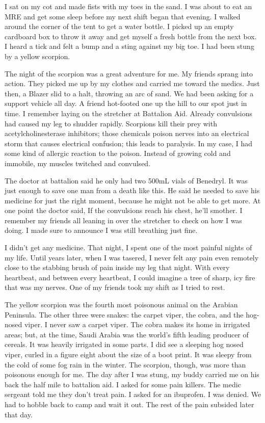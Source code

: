 I sat on my cot and made fists with my toes in the sand.  I was about to eat an MRE and get some sleep before my next shift began that evening.  I walked around the corner of the tent to get a water bottle.  I picked up an empty cardboard box to throw it away and get myself a fresh bottle from the next box.  I heard a tick and felt a bump and a sting against my big toe.  I had been stung by a yellow scorpion.

The night of the scorpion was a great adventure for me.  My friends sprang into action.  They picked me up by my clothes and carried me toward the medics.  Just then, a Blazer slid to a halt, throwing an arc of sand.  We had been asking for a support vehicle all day.  A friend hot-footed one up the hill to our spot just in time.  I remember laying on the stretcher at Battalion Aid.  Already convulsions had caused my leg to shudder rapidly.  Scorpions kill their prey with acetylcholinesterase inhibitors; those chemicals poison nerves into an electrical storm that causes electrical confusion; this leads to paralysis.  In my case, I had some kind of allergic reaction to the poison.  Instead of growing cold and immobile, my muscles twitched and convulsed.

The doctor at battalion said he only had two 500mL vials of Benedryl.  It was just enough to save one man from a death like this.  He said he needed to save his medicine for just the right moment, because he might not be able to get more.  At one point the doctor said, If the convulsions reach his chest, he'll smother.  I remember my friends all leaning in over the stretcher to check on how I was doing.  I made sure to announce I was still breathing just fine.

I didn't get any medicine.  That night, I spent one of the most painful nights of my life.  Until years later, when I was tasered, I never felt any pain even remotely close to the stabbing brush of pain inside my leg that night.  With every heartbeat, and between every heartbeat, I could imagine a tree of sharp, icy fire that was my nerves.  One of my friends took my shift as I tried to rest.

The yellow scorpion was the fourth most poisonous animal on the Arabian Peninsula.  The other three were snakes:  the carpet viper, the cobra, and the hog-nosed viper.  I never saw a carpet viper.  The cobra makes its home in irrigated areas; but, at the time, Saudi Arabia was the world's fifth leading producer of cereals.  It was heavily irrigated in some parts.  I did see a sleeping hog nosed viper, curled in a figure eight about the size of a boot print.  It was sleepy from the cold of some fog rain in the winter.  The scorpion, though, was more than poisonous enough for me.  The day after I was stung, my buddy carried me on his back the half mile to battalion aid.  I asked for some pain killers.  The medic sergeant told me they don't treat pain.  I asked for an ibuprofen.  I was denied.  We had to hobble back to camp and wait it out.  The rest of the pain subsided later that day.

